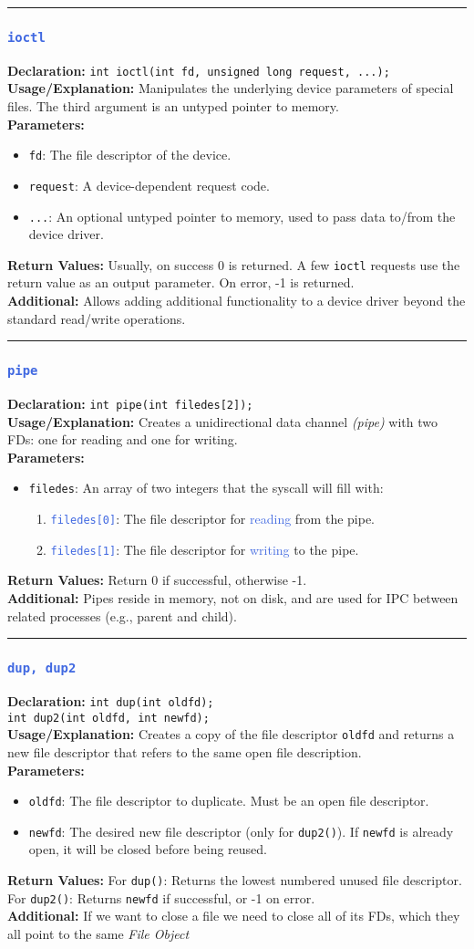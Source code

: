 \documentclass[openany,12pt]{book}
\newcommand{\code}[1]{\texttt{#1}}
\newcommand{\blue}[1]{\textcolor{RoyalBlue}{#1}}
\newcommand{\functionEntryPar}[6]{%
  \noindent\rule{\linewidth}{0.5pt}
  \subsubsection*{\blue{\large{\texttt{#1}}}}
  \textbf{Declaration:} \texttt{#2} \\
  \textbf{Usage/Explanation:} #3 \\
  \textbf{Parameters:}
  \begin{itemize}[leftmargin=*]
    #4
  \end{itemize}
  \textbf{Return Values:} #5 \\
  \textbf{Additional:} #6
  \vspace{1em}
}
\begin{document}
\functionEntryPar{ioctl}
{int ioctl(int fd, unsigned long request, ...);}
{Manipulates the underlying device parameters of special files. The third argument is an untyped pointer to memory.}
{\item \code{fd}: The file descriptor of the device.
 \item \code{request}: A device-dependent request code.
 \item \code{...}: An optional untyped pointer to memory, used to pass data to/from the device driver.}
{Usually, on success 0 is returned. A few \code{ioctl} requests use the return value as an output parameter. On error, -1 is returned.}
{Allows adding additional functionality to a device driver beyond the standard read/write operations.\label{func:ioctl}}

\functionEntryPar{pipe}
{int pipe(int filedes[2]);}
{Creates a unidirectional data channel \textit{(pipe)} with two FDs: one for reading and one for writing.}
{
  \item \code{filedes}: An array of two integers that the syscall will fill with:

  \begin{enumerate}[leftmargin=*]
    \item \blue{\code{filedes[0]}}: The file descriptor for \blue{reading} from the pipe.
    \item \blue{\code{filedes[1]}}: The file descriptor for \blue{writing} to the pipe.
  \end{enumerate}
}
{Return 0 if successful, otherwise -1.}
{Pipes reside in memory, not on disk, and are used for IPC between related processes (e.g., parent and child).\label{func:pipe}}

\functionEntryPar{dup, dup2}
{int dup(int oldfd);\\ int dup2(int oldfd, int newfd);}
{Creates a copy of the file descriptor \code{oldfd} and returns a new file descriptor that refers to the same open file description.}
{
  \item \code{oldfd}: The file descriptor to duplicate. Must be an open file descriptor.
  \item \code{newfd}: The desired new file descriptor (only for \code{dup2()}). If \code{newfd} is already open, it will be closed before being reused.
}
{
  For \code{dup()}: Returns the lowest numbered unused file descriptor.\\
  For \code{dup2()}: Returns \code{newfd} if successful, or -1 on error.
}
{If we want to close a file we need to close all of its FDs, which they all point to the same \textit{File Object}\label{func:dup}}
\end{document}
